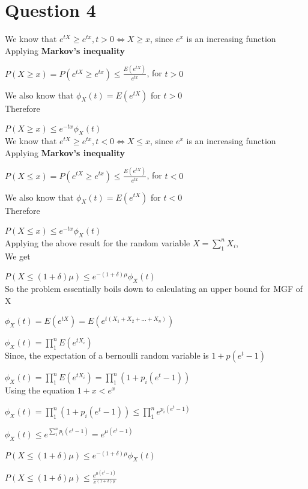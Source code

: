 \documentclass{article}
\begin{document}
\section*{Question 4}
    We know that $e^{tX} \geq e^{tx} ,t>0 \iff X \geq x$, since $e^x$  is an increasing function \\
    Applying \textbf{Markov's inequality}\par 
    $P(X \geq x) = P(e^{tX} \geq e^{tx}) \leq \frac{E(e^{tX})}{e^{tx}}$, for $t > 0$\par 
    We also know that $\phi_X(t) = E(e^{tX})$ for $t > 0$\\ 
    Therefore \par 
    $P(X \geq x)  \leq e^{-tx}\phi_X(t)$\\
    We know that $e^{tX} \geq e^{tx} ,t<0 \iff X \leq x$, since $e^x$  is an increasing function \\
    Applying \textbf{Markov's inequality}\par 
    $P(X \leq x) = P(e^{tX} \geq e^{tx}) \leq \frac{E(e^{tX})}{e^{tx}}$, for $t < 0$\par 
    We also know that $\phi_X(t) = E(e^{tX})$ for $t < 0$\\ 
    Therefore \par 
    $P(X \leq x)  \leq e^{-tx}\phi_X(t)$\\
    Applying the above result for the random variable $X = \sum_1^n X_i$,\\
    We get \par 
    $P(X \leq (1+\delta)\mu) \leq e^{-(1+\delta)\mu} \phi_X(t)$\\
    So the problem essentially boils down to calculating an upper bound for MGF of X\par
    $\phi_X(t) = E(e^{tX}) = E(e^{t(X_1+X_2+...+X_n)}) $\par 
    $\phi_X(t) = \prod_1^n E(e^{tX_i})$\\
    Since, the expectation of a bernoulli random variable is $1 +p(e^t -1)$\par 
    $\phi_X(t) = \prod_1^n E(e^{tX_i}) = \prod_1^n (1+p_i(e^t -1))$\\
    Using the equation $1 + x < e^x$\par 
    $\phi_X(t) =\prod_1^n (1+p_i(e^t -1)) \leq \prod_1^n e^{p_i(e^t -1)}$\par 
    $\phi_X(t) \leq e^{\sum_1^n p_i(e^t - 1)} = e^{\mu(e^t - 1)}$\par 
    $P(X \leq (1+\delta)\mu) \leq e^{-(1+\delta)\mu} \phi_X(t)$\par
    $P(X \leq (1+\delta)\mu) \leq \frac{e^{\mu(e^t - 1)}}{e^{(1+\delta)\mu}}$
\end{document}
